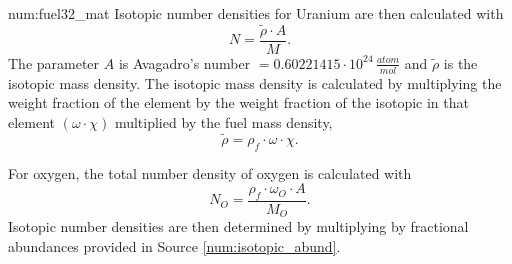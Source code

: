 \begin{numitem}{num:fuel32_mat}
Isotopic number densities for Uranium are then calculated with
\[
    N = \frac{\widetilde{\rho} \cdot A}{M}.
\]
The parameter $A$ is Avagadro's number $=0.60221415\cdot 10^{24}\,\frac{atom}{mol}$ and $\widetilde{\rho}$ is the isotopic mass density. The isotopic mass density is calculated by multiplying the weight fraction of the element by the weight fraction of the isotopic in that element $\left(\omega\cdot\chi\right)$ multiplied by the fuel mass density,
\[
  \widetilde{\rho} = \rho_f\cdot \omega \cdot \chi.
\]

For oxygen, the total number density of oxygen is calculated with
\[
    N_O = \frac{\rho_f \cdot \omega_O \cdot A}{M_O}.
\]
Isotopic number densities are then determined by multiplying by fractional abundances provided in Source \ref{num:isotopic_abund}.


\end{numitem}


